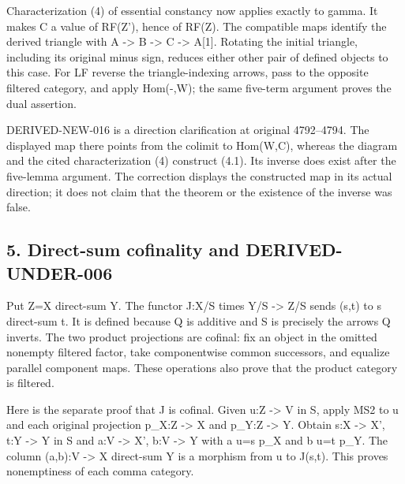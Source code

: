 \documentclass[11pt]{article}
\begin{document}
Characterization (4)\allowbreak{} of essential constancy now applies exactly to gamma. It makes C a value of RF(Z')\allowbreak{},\allowbreak{} hence of RF(Z)\allowbreak{}. The compatible maps identify the derived triangle with A \allowbreak{}-> B \allowbreak{}-> C \allowbreak{}-> A[1]\allowbreak{}. Rotating the initial triangle,\allowbreak{} including its original minus sign,\allowbreak{} reduces either other pair of defined objects to this case. For LF reverse the triangle-indexing arrows,\allowbreak{} pass to the opposite filtered category,\allowbreak{} and apply Hom(-,\allowbreak{}W)\allowbreak{}; the same five-term argument proves the dual assertion.

DERIVED-NEW-016 is a direction clarification at original 4792–\allowbreak{}4794. The displayed map there points from the colimit to Hom(W,\allowbreak{}C)\allowbreak{},\allowbreak{} whereas the diagram and the cited characterization (4)\allowbreak{} construct (4.1)\allowbreak{}. Its inverse does exist after the five-lemma argument. The correction displays the constructed map in its actual direction; it does not claim that the theorem or the existence of the inverse was false.

\subsection{5. Direct-sum cofinality and DERIVED-UNDER-006}\label{proofs-4166-5089-direct-sum-cofinality-and-derived-under-006}

Put Z\allowbreak{}=X direct-sum Y. The functor J:\allowbreak{}X/\allowbreak{}S times Y/\allowbreak{}S \allowbreak{}-> Z/\allowbreak{}S sends (s,\allowbreak{}t)\allowbreak{} to s direct-sum t. It is defined because Q is additive and S is precisely the arrows Q inverts. The two product projections are cofinal:\allowbreak{} fix an object in the omitted nonempty filtered factor,\allowbreak{} take componentwise common successors,\allowbreak{} and equalize parallel component maps. These operations also prove that the product category is filtered.

Here is the separate proof that J is cofinal. Given u:\allowbreak{}Z \allowbreak{}-> V in S,\allowbreak{} apply MS2 to u and each original projection p\_\allowbreak{}X:\allowbreak{}Z \allowbreak{}-> X and p\_\allowbreak{}Y:\allowbreak{}Z \allowbreak{}-> Y. Obtain s:\allowbreak{}X \allowbreak{}-> X',\allowbreak{} t:\allowbreak{}Y \allowbreak{}-> Y\textquotesingle{} in S and a:\allowbreak{}V \allowbreak{}-> X',\allowbreak{} b:\allowbreak{}V \allowbreak{}-> Y\textquotesingle{} with a u\allowbreak{}=s p\_\allowbreak{}X and b u\allowbreak{}=t p\_\allowbreak{}Y. The column (a,\allowbreak{}b)\allowbreak{}:\allowbreak{}V \allowbreak{}-> X\textquotesingle{} direct-sum Y\textquotesingle{} is a morphism from u to J(s,\allowbreak{}t)\allowbreak{}. This proves nonemptiness of each comma category.
\end{document}

